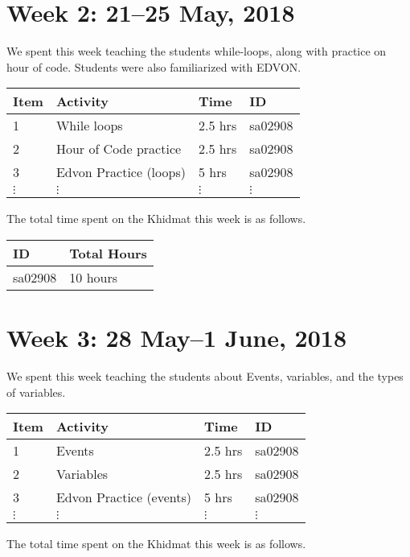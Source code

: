 \documentclass{article}
\begin{document}

\newpage 
\section*{Week 2: 21--25 May, 2018}

We spent this week teaching the students while-loops, along with practice on hour of code. Students were also familiarized with EDVON.

\begin{tabular}{|l|l|l|l|}
  \hline
  Item  & Activity & Time & ID \\\hline\hline
  1 & While loops & 2.5 hrs & sa02908 \\\hline
  2 & Hour of Code practice & 2.5 hrs & sa02908 \\\hline
  3 & Edvon Practice (loops) & 5 hrs & sa02908 \\\hline
  $\vdots$ & $\vdots$ & $\vdots$ & $\vdots$ \\\hline
\end{tabular}

The total time spent on the Khidmat this week is as follows.

\begin{tabular}{|l|l|}
  \hline
  ID & Total Hours\\\hline\hline
  sa02908 & 10 hours\\\hline
\end{tabular}


\newpage 
\section*{Week 3: 28 May--1 June, 2018}

We spent this week teaching the students about Events, variables, and the types of variables.

\begin{tabular}{|l|l|l|l|}
  \hline
  Item  & Activity & Time & ID \\\hline\hline
  1 & Events & 2.5 hrs & sa02908 \\\hline
  2 & Variables & 2.5 hrs & sa02908 \\\hline
  3 & Edvon Practice (events) & 5 hrs & sa02908 \\\hline
  $\vdots$ & $\vdots$ & $\vdots$ & $\vdots$ \\\hline
\end{tabular}

The total time spent on the Khidmat this week is as follows.
\end{document}
